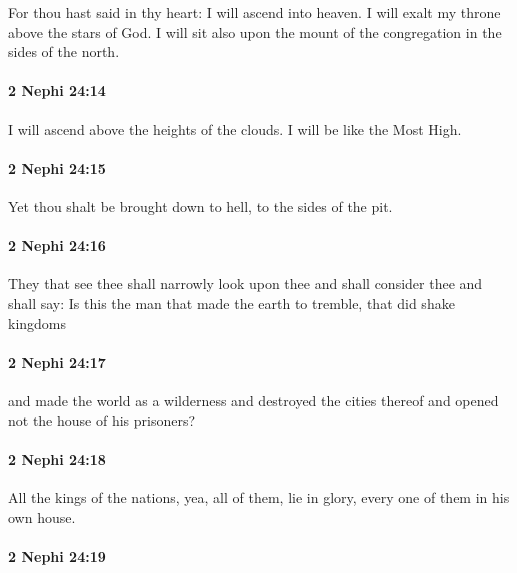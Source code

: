 			For thou hast said in thy heart:
			I will ascend into heaven.
			I will exalt my throne above the stars of God.
			I will sit also upon the mount of the congregation in the sides of the north.

		\paragraph{2 Nephi 24:14} %
			\label{2NEPHI-24-14}

			I will ascend above the heights of the clouds.
			I will be like the Most High.

		\paragraph{2 Nephi 24:15} %
			\label{2NEPHI-24-15}

			Yet thou shalt be brought down to hell, to the sides of the pit.

		\paragraph{2 Nephi 24:16} %
			\label{2NEPHI-24-16}

			They that see thee shall narrowly look upon thee
			and shall consider thee and shall say:
			Is this the man that made the earth to tremble,
			that did shake kingdoms

		\paragraph{2 Nephi 24:17} %
			\label{2NEPHI-24-17}

			and made the world as a wilderness
			and destroyed the cities thereof
			and opened not the house of his prisoners?

		\paragraph{2 Nephi 24:18} %
			\label{2NEPHI-24-18}

			All the kings of the nations, yea, all of them, lie in glory,
			every one of them in his own house.

		\paragraph{2 Nephi 24:19} %
			\label{2NEPHI-24-19}

